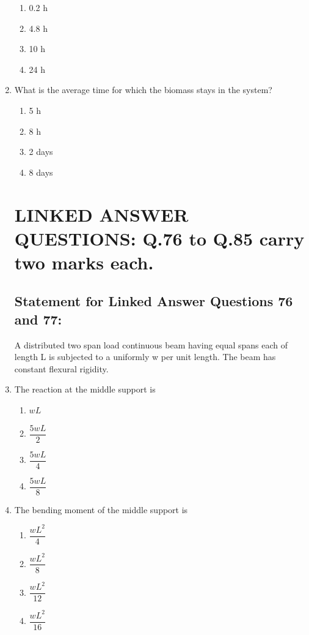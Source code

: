 \documentclass[journal,12pt,onecolumn]{IEEEtran}
\theoremstyle{remark}
\begin{document}
\begin{enumerate}
\hfill{}
\begin{enumerate}
\item 0.2 h
\item 4.8 h
\item 10 h
\item 24 h
\end{enumerate}

\item What is the average time for which the biomass stays in the system?

\hfill{}
\begin{enumerate}
\item 5 h
\item 8 h
\item 2 days
\item 8 days
\end{enumerate}

\section*{LINKED ANSWER QUESTIONS: Q.76 to Q.85 carry two marks each.}

\subsection*{Statement for Linked Answer Questions 76 and 77:}
A distributed two span load continuous beam having equal spans each of length L is subjected to a uniformly w per unit length. The beam has constant flexural rigidity.

\item The reaction at the middle support is

\hfill{}
\begin{enumerate}
\item $wL$
\item $\dfrac{5wL}{2}$
\item $\dfrac{5wL}{4}$
\item $\dfrac{5wL}{8}$
\end{enumerate}

\item The bending moment of the middle support is

\hfill{}
\begin{enumerate}
\item $\dfrac{wL^2}{4}$
\item $\dfrac{wL^2}{8}$
\item $\dfrac{wL^2}{12}$
\item $\dfrac{wL^2}{16}$
\end{enumerate}


\end{enumerate}
\end{document}
